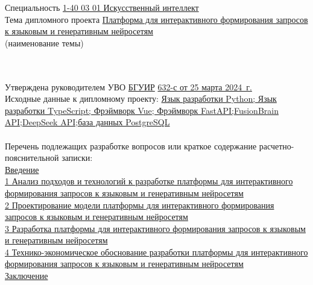 {\begin{center}
  Специальность \uline{1-40 03 01 Искусственный интеллект}\lineunderscore\\[0.5em]

  Тема дипломного проекта \uline{Платформа для интерактивного формирования
запросов к языковым и генеративным нейросетям}\lineunderscore \\
  {\footnotesize\hspace{15em}(наименование темы)}\\[-0.5em]
  \lineunderscore\\[0.5em]\lineunderscore\\
  \end{center}

  Утверждена руководителем УВО \uline{БГУИР} \textnumero  \uline{632-с от 25 марта 2024~г.}\lineunderscore\\[-0.5em]
  
  Исходные данные к дипломному проекту: \uline{Язык разработки Python; Язык разработки TypeScript; Фрэймворк Vue; Фрэймворк FastAPI;FusionBrain API;DeepSeek API;база данных PostgreSQL}\lineunderscore\\[0.5em]
  \lineunderscore\\
  
  Перечень подлежащих разработке вопросов или краткое содержание расчетно-пояснительной записки: 
  \lineunderscore\\
  \uline{Введение}\lineunderscore\\
  \uline{1 Анализ подходов и технологий к разработке платформы
для интерактивного формирования запросов к языковым и генеративным
нейросетям}\lineunderscore\\
  \uline{2 Проектирование модели платформы для интерактивного формирования
запросов к языковым и генеративным нейросетям}\lineunderscore\\
  \uline{3 Разработка платформы для интерактивного формирования
запросов к языковым и генеративным нейросетям}\lineunderscore\\
  \uline{4 Технико-экономическое обоснование разработки платформы для интерактивного формирования запросов к языковым и генеративным нейросетям}\lineunderscore\\
  \uline{Заключение}\lineunderscore\\
  \lineunderscore\\
  \clearpage
  \thispagestyle{empty}

}

